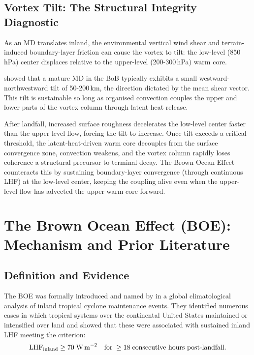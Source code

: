 \subsection{Vortex Tilt: The Structural Integrity Diagnostic}
\label{subsec:vortex_tilt_background}

As an MD translates inland, the environmental vertical wind shear and
terrain-induced boundary-layer friction can cause the vortex to tilt:
the low-level (850\,hPa) center displaces relative to the upper-level
(200-300\,hPa) warm core.

\citet{rashid2005track} showed that a mature MD in the BoB typically
exhibits a small westward-northwestward tilt of 50-200\,km, the
direction dictated by the mean shear vector. This tilt is sustainable
so long as organised convection couples the upper and lower parts of
the vortex column through latent heat release.

After landfall, increased surface roughness decelerates the low-level
center faster than the upper-level flow, forcing the tilt to
increase. Once tilt exceeds a critical threshold, the
latent-heat-driven warm core decouples from the surface convergence
zone, convection weakens, and the vortex column rapidly loses
coherence-a structural precursor to terminal decay. The Brown Ocean
Effect counteracts this by sustaining boundary-layer convergence
(through continuous LHF) at the low-level center, keeping the
coupling alive even when the upper-level flow has advected the upper
warm core forward.

\section{The Brown Ocean Effect (BOE): Mechanism and Prior Literature}
\label{sec:boe_literature}

\subsection{Definition and Evidence}
\label{subsec:boe_original}

The BOE was formally introduced and named by \citet{andersen2013} in a global
climatological analysis of inland tropical cyclone maintenance events. They
identified numerous cases in which tropical systems over the continental United
States maintained or intensified over land and showed that these were associated
with sustained inland LHF meeting the criterion:
\begin{equation}
  \text{LHF}_{\text{inland}} \geq 70\;\text{W\,m}^{-2}
  \quad\text{for}\;\geq 18\;\text{consecutive hours post-landfall.}
  \label{eq:boe_def}
\end{equation}

